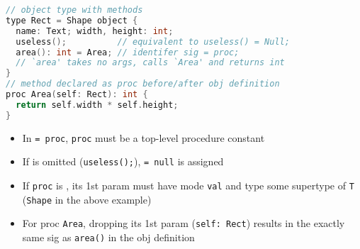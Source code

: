 \documentclass[10pt,a4paper,landscape]{article}
\begin{document}
\begin{multicols*}{3}
\begin{minipage}{\linewidth}
\begin{lstlisting}[language=c]
// object type with methods
type Rect = Shape object {
  name: Text; width, height: int;
  useless();          // equivalent to useless() = Null;
  area(): int = Area; // identifer sig = proc;
  // `area' takes no args, calls `Area' and returns int
}
// method declared as proc before/after obj definition
proc Area(self: Rect): int {
  return self.width * self.height;
}
\end{lstlisting}
\end{minipage}
\begin{itemize}
\item In \texttt{= proc}, \texttt{proc} must be a top-level procedure constant
\item If  is omitted (\texttt{useless();}), \texttt{= null} is assigned
\item If \texttt{proc} is , its 1st param must have mode \texttt{val} and type some supertype of \texttt{T} (\texttt{Shape} in the above example)
\item For proc \texttt{Area}, dropping its 1st param (\texttt{self: Rect}) results in the exactly same sig as \texttt{area()} in the obj definition
\end{itemize}
\end{multicols*}
\end{document}
